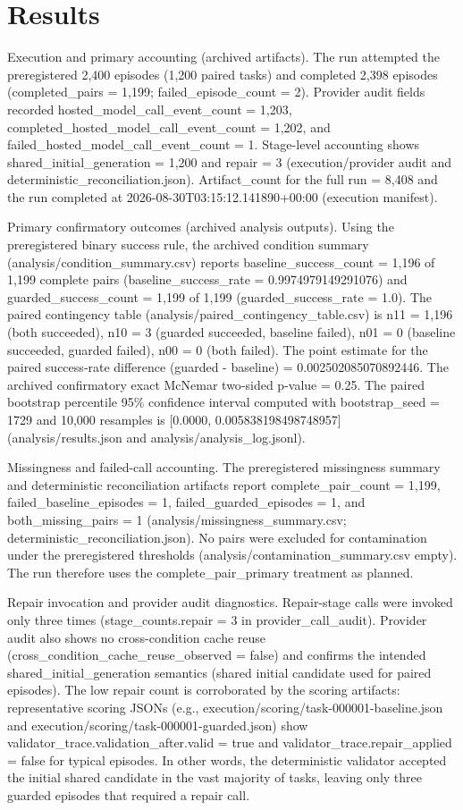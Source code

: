 \documentclass[conference]{IEEEtran}
\begin{document}
\section{Results}
Execution and primary accounting (archived artifacts). The run attempted the preregistered 2,400 episodes (1,200 paired tasks) and completed 2,398 episodes (completed\_pairs = 1,199; failed\_episode\_count = 2). Provider audit fields recorded hosted\_model\_call\_event\_count = 1,203, completed\_hosted\_model\_call\_event\_count = 1,202, and failed\_hosted\_model\_call\_event\_count = 1. Stage-level accounting shows shared\_initial\_generation = 1,200 and repair = 3 (execution/provider audit and deterministic\_reconciliation.json). Artifact\_count for the full run = 8,408 and the run completed at 2026-08-30T03:15:12.141890+00:00 (execution manifest).

Primary confirmatory outcomes (archived analysis outputs). Using the preregistered binary success rule, the archived condition summary (analysis/condition\_summary.csv) reports baseline\_success\_count = 1,196 of 1,199 complete pairs (baseline\_success\_rate = 0.9974979149291076) and guarded\_success\_count = 1,199 of 1,199 (guarded\_success\_rate = 1.0). The paired contingency table (analysis/paired\_contingency\_table.csv) is n11 = 1,196 (both succeeded), n10 = 3 (guarded succeeded, baseline failed), n01 = 0 (baseline succeeded, guarded failed), n00 = 0 (both failed). The point estimate for the paired success‑rate difference (guarded - baseline) = 0.002502085070892446. The archived confirmatory exact McNemar two‑sided p-value = 0.25. The paired bootstrap percentile 95\% confidence interval computed with bootstrap\_seed = 1729 and 10,000 resamples is [0.0000, 0.005838198498748957] (analysis/results.json and analysis/analysis\_log.jsonl).

Missingness and failed-call accounting. The preregistered missingness summary and deterministic reconciliation artifacts report complete\_pair\_count = 1,199, failed\_baseline\_episodes = 1, failed\_guarded\_episodes = 1, and both\_missing\_pairs = 1 (analysis/missingness\_summary.csv; deterministic\_reconciliation.json). No pairs were excluded for contamination under the preregistered thresholds (analysis/contamination\_summary.csv empty). The run therefore uses the complete\_pair\_primary treatment as planned.

Repair invocation and provider audit diagnostics. Repair-stage calls were invoked only three times (stage\_counts.repair = 3 in provider\_call\_audit). Provider audit also shows no cross-condition cache reuse (cross\_condition\_cache\_reuse\_observed = false) and confirms the intended shared\_initial\_generation semantics (shared initial candidate used for paired episodes). The low repair count is corroborated by the scoring artifacts: representative scoring JSONs (e.g., execution/scoring/task-000001-baseline.json and execution/scoring/task-000001-guarded.json) show validator\_trace.validation\_after.valid = true and validator\_trace.repair\_applied = false for typical episodes. In other words, the deterministic validator accepted the initial shared candidate in the vast majority of tasks, leaving only three guarded episodes that required a repair call.
\end{document}
